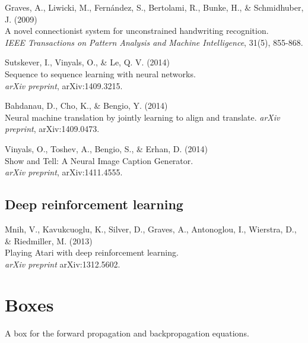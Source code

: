 \documentclass[]{article}
\begin{document}
Graves, A., Liwicki, M., Fernández, S., Bertolami, R., Bunke, H., \&
Schmidhuber, J. (2009)\\ A novel connectionist system for unconstrained
handwriting recognition.\\ {\it IEEE Transactions on Pattern Analysis and
  Machine Intelligence}, 31(5), 855-868.


Sutskever, I., Vinyals, O., \& Le, Q. V. (2014)\\ Sequence to sequence
learning with neural networks.\\ {\it arXiv preprint}, arXiv:1409.3215.

Bahdanau, D., Cho, K., \& Bengio, Y. (2014)\\ Neural machine translation by
jointly learning to align and translate.  {\it arXiv preprint},
arXiv:1409.0473.

Vinyals, O., Toshev, A., Bengio, S., \& Erhan, D. (2014)\\ Show and Tell: A
Neural Image Caption Generator.\\ {\it arXiv preprint}, arXiv:1411.4555.




\subsection{Deep reinforcement learning}
Mnih, V., Kavukcuoglu, K., Silver, D., Graves, A., Antonoglou, I.,
Wierstra, D., \& Riedmiller, M. (2013)\\ Playing Atari with deep
reinforcement learning.\\ {\it arXiv preprint} arXiv:1312.5602.

\newpage

\section{Boxes}

A box for the forward propagation and backpropagation equations.
\end{document}
